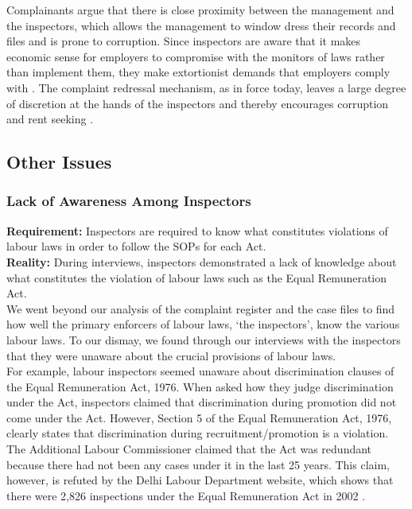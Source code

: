 \documentclass[a4paper, 12pt, twoside]{article}
\begin{document}
Complainants argue that there is close proximity between the management and the inspectors, which allows the management to window dress their records and files and is prone to corruption. Since inspectors are aware that it makes economic sense for employers to compromise with the monitors of laws rather than implement them, they make extortionist demands that employers comply with \parencite{hindunews2}. The complaint redressal mechanism, as in force today, leaves a large degree of discretion at the hands of the inspectors and thereby encourages corruption and rent seeking \parencite{debroynews}. 

\subsection{Other Issues}
\subsubsection{Lack of Awareness Among Inspectors}

\textbf{Requirement:} Inspectors are required to know what constitutes violations of labour laws in order to follow the SOPs for each Act. \\

\textbf{Reality:} During interviews, inspectors demonstrated a lack of knowledge about what constitutes the violation of labour laws such as the Equal Remuneration Act.\\

We went beyond our analysis of the complaint register and the case files to find how well the primary enforcers of labour laws, ‘the inspectors’, know the various labour laws. To our dismay, we found through our interviews with the inspectors that they were unaware about the crucial provisions of labour laws. \\

For example, labour inspectors seemed unaware about discrimination clauses of the Equal Remuneration Act, 1976. When asked how they judge discrimination under the Act, inspectors claimed that discrimination during promotion did not come under the Act. However, Section 5 of the Equal Remuneration Act, 1976, clearly states that discrimination during recruitment/promotion is a violation. The Additional Labour Commissioner claimed that the Act was redundant because there had not been any cases under it in the last 25 years. This claim, however, is refuted by the Delhi Labour Department website, which shows that there were 2,826 inspections under the Equal Remuneration Act in 2002 \parencite{officeofthelabourcommissioner}. \\
\end{document}
